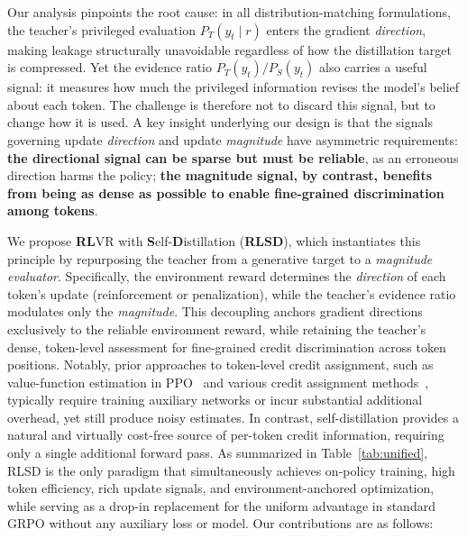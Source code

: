 \documentclass[]{jingdong}
\begin{document}
Our analysis pinpoints the root cause: in all distribution-matching formulations, the teacher's privileged evaluation $P_T(y_t \mid r)$ enters the gradient \textit{direction}, making leakage structurally unavoidable regardless of how the distillation target is compressed. Yet the evidence ratio $P_T(y_t)/P_S(y_t)$ also carries a useful signal: it measures how much the privileged information revises the model's belief about each token. The challenge is therefore not to discard this signal, but to change how it is used. A key insight underlying our design is that the signals governing update \textit{direction} and update \textit{magnitude} have asymmetric requirements: \textbf{the directional signal can be sparse but must be reliable}, as an erroneous direction harms the policy; \textbf{the magnitude signal, by contrast, benefits from being as dense as possible to enable fine-grained discrimination among tokens}. 

We propose \textbf{RL}VR with \textbf{S}elf-\textbf{D}istillation (\textbf{RLSD}), which instantiates this principle by repurposing the teacher from a generative target to a \textit{magnitude evaluator}. Specifically, the environment reward determines the \textit{direction} of each token's update (reinforcement or penalization), while the teacher's evidence ratio modulates only the \textit{magnitude}. This decoupling anchors gradient directions exclusively to the reliable environment reward, while retaining the teacher's dense, token-level assessment for fine-grained credit discrimination across token positions. Notably, prior approaches to token-level credit assignment, such as value-function estimation in PPO~\citep{schulman2017proximalpolicyoptimizationalgorithmsppo} and various credit assignment methods~\citep{xie2025unlocking,li2026outcome}, typically require training auxiliary networks or incur substantial additional overhead, yet still produce noisy estimates. In contrast, self-distillation provides a natural and virtually cost-free source of per-token credit information, requiring only a single additional forward pass. As summarized in Table~\ref{tab:unified}, RLSD is the only paradigm that simultaneously achieves on-policy training, high token efficiency, rich update signals, and environment-anchored optimization, while serving as a drop-in replacement for the uniform advantage in standard GRPO without any auxiliary loss or model. Our contributions are as follows:
\end{document}
